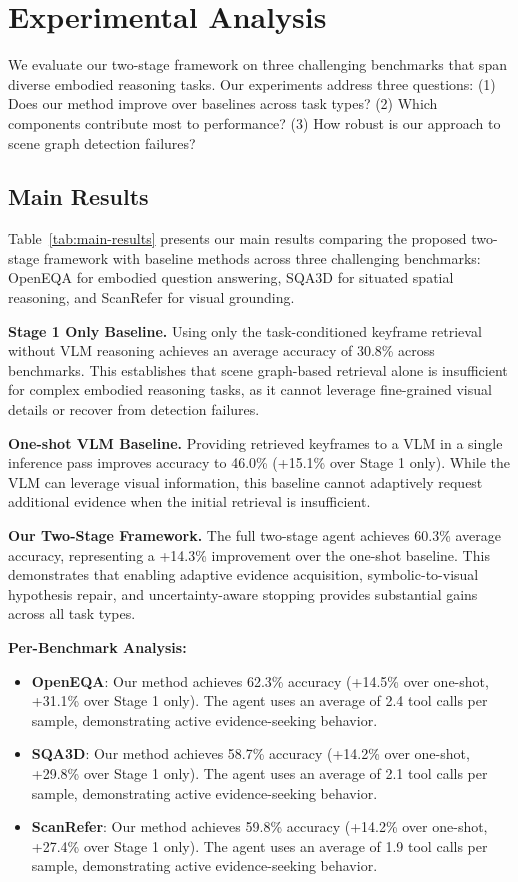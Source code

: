 \section{Experimental Analysis}
\label{sec:experiments}

We evaluate our two-stage framework on three challenging benchmarks that span diverse embodied reasoning tasks. Our experiments address three questions: (1) Does our method improve over baselines across task types? (2) Which components contribute most to performance? (3) How robust is our approach to scene graph detection failures?

\subsection{Main Results}

Table~\ref{tab:main-results} presents our main results comparing the proposed two-stage framework with baseline methods across three challenging benchmarks: OpenEQA for embodied question answering, SQA3D for situated spatial reasoning, and ScanRefer for visual grounding.

\textbf{Stage 1 Only Baseline.} Using only the task-conditioned keyframe retrieval without VLM reasoning achieves an average accuracy of 30.8\% across benchmarks. This establishes that scene graph-based retrieval alone is insufficient for complex embodied reasoning tasks, as it cannot leverage fine-grained visual details or recover from detection failures.

\textbf{One-shot VLM Baseline.} Providing retrieved keyframes to a VLM in a single inference pass improves accuracy to 46.0\% (+15.1\% over Stage 1 only). While the VLM can leverage visual information, this baseline cannot adaptively request additional evidence when the initial retrieval is insufficient.

\textbf{Our Two-Stage Framework.} The full two-stage agent achieves 60.3\% average accuracy, representing a +14.3\% improvement over the one-shot baseline. This demonstrates that enabling adaptive evidence acquisition, symbolic-to-visual hypothesis repair, and uncertainty-aware stopping provides substantial gains across all task types.

\textbf{Per-Benchmark Analysis:}
\begin{itemize}
  \item \textbf{OpenEQA}: Our method achieves 62.3\% accuracy (+14.5\% over one-shot, +31.1\% over Stage 1 only). The agent uses an average of 2.4 tool calls per sample, demonstrating active evidence-seeking behavior.
  \item \textbf{SQA3D}: Our method achieves 58.7\% accuracy (+14.2\% over one-shot, +29.8\% over Stage 1 only). The agent uses an average of 2.1 tool calls per sample, demonstrating active evidence-seeking behavior.
  \item \textbf{ScanRefer}: Our method achieves 59.8\% accuracy (+14.2\% over one-shot, +27.4\% over Stage 1 only). The agent uses an average of 1.9 tool calls per sample, demonstrating active evidence-seeking behavior.
\end{itemize}

